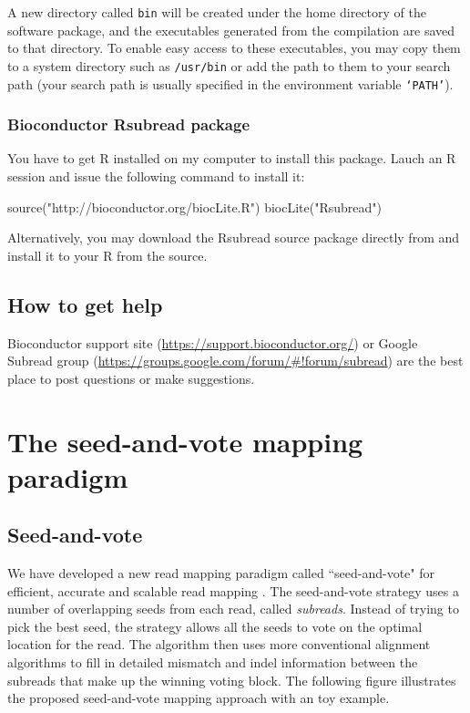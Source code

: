 \documentclass[12pt]{report}
\newcommand{\code}[1]{{\small\texttt{#1}}}
\newcommand{\Rsubread}{\textsf{Rsubread}}
\newcommand{\R}{\textsf{R}}
\begin{document}
A new directory called \code{bin} will be created under the home directory of the software package, and the executables generated from the compilation are saved to that directory.
To enable easy access to these executables, you may copy them to a system directory such as \code{/usr/bin} or add the path to them to your search path (your search path is usually specified in the environment variable \code{`PATH'}).


\subsection{Bioconductor {\Rsubread} package}

You have to get {\R} installed on my computer to install this package.
Lauch an {\R} session and issue the following command to install it:

\begin{Rcode}
source("http://bioconductor.org/biocLite.R")
biocLite("Rsubread")
\end{Rcode}

Alternatively, you may download the {\Rsubread} source package directly from { } and install it to your {\R} from the source.


\section{How to get help}

Bioconductor support site (\url{https://support.bioconductor.org/}) or Google Subread group (\url{https://groups.google.com/forum/#!forum/subread}) are the best place to post questions or make suggestions.


\chapter{The seed-and-vote mapping paradigm}

\section{Seed-and-vote}

We have developed a new read mapping paradigm called ``seed-and-vote" for efficient, accurate and scalable read mapping \cite{liao}.
The seed-and-vote strategy uses a number of overlapping seeds from each read, called \emph{subreads}.
Instead of trying to pick the best seed, the strategy allows all the seeds to vote on the optimal location for the read.
The algorithm then uses more conventional alignment algorithms to fill in detailed mismatch and indel information between the subreads that make up the winning voting block. 
The following figure illustrates the proposed seed-and-vote mapping approach with an toy example.
\end{document}
